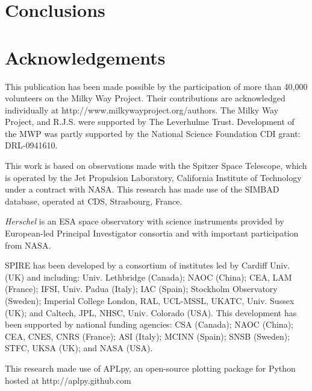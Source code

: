 \documentclass[a4,useAMS,usenatbib]{mn2e}
\begin{document}
\section{Conclusions}


\section{Acknowledgements}
This publication has been made possible by the participation of more than 40,000 volunteers on the Milky Way Project. Their contributions are acknowledged individually at http://www.milkywayproject.org/authors. The Milky Way Project, and R.J.S. were supported by The Leverhulme Trust. Development of the MWP was partly supported by the National Science Foundation CDI grant: DRL-0941610. 

This work is based on observations made with the Spitzer Space Telescope, which is operated by the Jet Propulsion Laboratory, California Institute of Technology under a contract with NASA. This research has made use of the SIMBAD database, operated at CDS, Strasbourg, France.

{\em Herschel} is an ESA space observatory with science instruments
provided by European-led Principal Investigator consortia and with important
participation from NASA.

SPIRE has been developed by a consortium of institutes led by Cardiff
Univ. (UK) and including: Univ. Lethbridge (Canada); NAOC (China);
CEA, LAM (France); IFSI, Univ. Padua (Italy); IAC (Spain); Stockholm
Observatory (Sweden); Imperial College London, RAL, UCL-MSSL, UKATC,
Univ. Sussex (UK); and Caltech, JPL, NHSC, Univ. Colorado (USA). This
development has been supported by national funding agencies: CSA
(Canada); NAOC (China); CEA, CNES, CNRS (France); ASI (Italy); MCINN
(Spain); SNSB (Sweden); STFC, UKSA (UK); and NASA (USA).

This research made use of APLpy, an open-source plotting package for
Python hosted at http://aplpy.github.com
\end{document}
